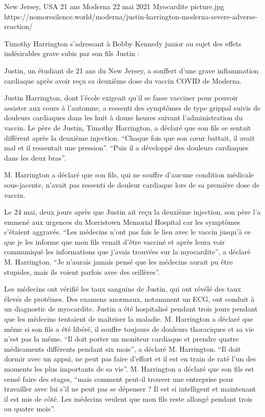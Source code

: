 {New Jersey, USA}
{21 ans}
{Moderna}
{22 mai 2021}
{Myocardite}
{picture.jpg}
{https://nomoresilence.world/moderna/justin-harrington-moderna-severe-adverse-reaction/}
{

\normalsize

Timothy Harrington s'adressant à Bobby Kennedy junior au sujet des effets
indésirables grave subis par son fils Justin :

Justin, un étudiant de 21 ans du New Jersey, a souffert d'une grave inflammation
cardiaque après avoir reçu sa deuxième dose du vaccin COVID de Moderna.

Justin Harrington, dont l'école exigeait qu'il se fasse vacciner pour pouvoir
assister aux cours à l'automne, a ressenti des symptômes de type grippal suivis
de douleurs cardiaques dans les huit à douze heures suivant l'administration du
vaccin. Le père de Justin, Timothy Harrington, a déclaré que son fils se sentait
différent après la deuxième injection. “Chaque fois que son cœur battait, il
avait mal et il ressentait une pression”. “Puis il a développé des douleurs
cardiaques dans les deux bras”.

M. Harrington a déclaré que son fils, qui ne souffre d'aucune condition médicale
sous-jacente, n'avait pas ressenti de douleur cardiaque lors de sa première dose
de vaccin.

Le 24 mai, deux jours après que Justin ait reçu la deuxième injection, son père
l'a emmené aux urgences du Morristown Memorial Hospital car les symptômes
s'étaient aggravés. “Les médecins n'ont pas fais le lien avec le vaccin jusqu'à
ce que je les informe que mon fils venait d'être vacciné et après leura voir
communiqué les informations que j'avais trouvées sur la myocardite”, a déclaré
M. Harrington. “Je n'aurais jamais pensé que les médecins aurait pu être
stupides, mais ils voient parfois avec des œillères”.

Les médecins ont vérifié les taux sanguins de Justin, qui ont révélé des taux
élevés de protéines. Des examens anormaux, notamment un ECG, ont conduit à un
diagnostic de myocardite. Justin a été hospitalisé pendant trois jours pendant
que les médecins tentaient de maîtriser la maladie. M. Harrington a déclaré que
même si son fils a été libéré, il souffre toujours de douleurs thoraciques et sa
vie n'est pas la même. “Il doit porter un moniteur cardiaque et prendre quatre
médicaments différents pendant six mois”, a déclaré M. Harrington. “Il doit
dormir avec un appui, ne peut pas faire d'effort et il est en train de raté l'un
des moments les plus importants de sa vie”. M. Harrington a déclaré que son fils
est censé faire des stages, “mais comment peut-il trouver une entreprise pour
travailler avec lui s'il ne peut pas se dépenser ? Il est si intelligent et
maintenant il est mis de côté. Les médecins veulent que mon fils reste allongé
pendant trois ou quatre mois”.

}
